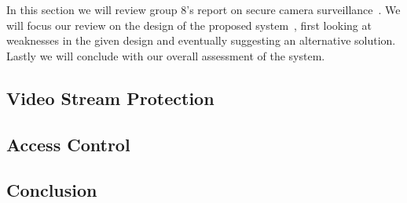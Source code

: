
In this section we will review group 8's report on secure camera
surveillance~\cite{8}. We will focus our review on the design of the
proposed system~\cite[sec. 3]{8}, first looking at weaknesses in the
given design and eventually suggesting an alternative solution. Lastly
we will conclude with our overall assessment of the system.

\subsection{Video Stream Protection}
\label{sec:8-enc}


\subsection{Access Control}
\label{sec:8-secret}


\subsection{Conclusion}
\label{sec:8-conc}

